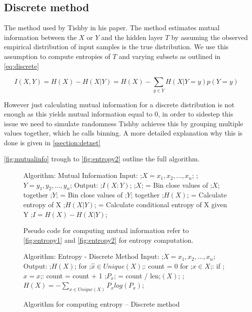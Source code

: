 \subsection{Discrete method} 

  The method used by Tishby in his paper. The method estimates mutual
  information between the $X$ or $Y$ and the hidden layer $T$ by assuming the
  observed empirical distribution of input samples is the true distribution. We
  use this assumption to compute entropies of $T$ and varying subsets as
  outlined in \autoref{eq:discrete}

\begin{equation}
  I(X, Y) = H(X) - H(X|Y) = H(X) - \sum _{y\in Y} H(X|Y = y)p(Y = y)
\label{eq:discrete}
\end{equation} 


  However just calculating mutual information for a discrete distribution is not
  enough as this yields mutual information equal to 0, in order to sidestep this
  issue we need to simulate randomness Tishby achieves this by grouping multiple
  values together, which he calls binning. A more detailed explanation why this
  is done is given in \autoref{ssection:detnet}

   \autoref{fig:mutualinfo} trough to \autoref{fig:entropy2} outline the full
   algorithm.
\begin{figure}[H]
    \begin{pythonfigure}
      Algorithm: Mutual Information
      Input: 
      ;$X = x_1, x_2,...,x_n$;
      ;$Y = y_1, y_2,...,y_n$;
      Output: ;$I(X:Y)$;
      ;$X$; = Bin close values of ;$X$; together
      ;$Y$; = Bin close values of ;$Y$; together
      ;$H(X)$; = Calculate entropy of X
      ;$H(X|Y)$; = Calculate conditional entropy of X given Y
      ;$I = H(X) - H(X|Y)$;
    \end{pythonfigure}
    \caption{Pseudo code for computing mutual information refer to
    \autoref{fig:entropy1} and \autoref{fig:entropy2} for entropy computation.}
    \label{fig:mutualinfo}
\end{figure}

\begin{figure}[H]
    \begin{pythonfigure}
      Algorithm: Entropy - Discrete Method
      Input: ;$X = x_1, x_2,...,x_n$;
      Output: ;$H(X)$;
      for ;$ \hat{x}\in Unique(X)$;:
        count = 0       
        for ;$x \in X$;:
          if ;$\hat{x} = x$;:
            count = count + 1
        ;$P_x$; = count / len;$(X)$;
      ;$H(X) = - \sum _{x\in Unique(X)} P_x log(P_x)$; 
    \end{pythonfigure}
    \caption{Algorithm for computing entropy -- Discrete method}
    \label{fig:entropy1}
\end{figure} 

